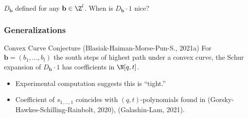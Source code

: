\documentclass{beamer}
\newcommand{\bb}{{\mathbf b}}
\newcounter{c}
\begin{document}
\begin{frame}
  \(D_\bb\) defined for any \(\bb \in \Z^l\). When is \(D_\bb \cdot
  1\) nice?\pause
  \frametitle{Generalizations}
    \pause
  \begin{block}{Convex Curve Conjecture (Blasiak-Haiman-Morse-Pun-S., 2021a)}
    For \(\bb = (b_1,\ldots,b_l)\) the south steps of highest path
    under a convex curve, the Schur expansion of
    \(D_{\bb} \cdot 1\) has coefficients in \(\N[q,t]\).
  \end{block}\pause
  \begin{itemize}
  \item Experimental computation suggests this is ``tight.''\pause
  \item Coefficient of \(s_{1,\ldots,1}\) coincides with \((q,t)\)-polynomials
    found in (Gorsky-Hawkes-Schilling-Rainbolt, 2020),
    (Galashin-Lam, 2021).
  \end{itemize}
\end{frame}
\end{document}
